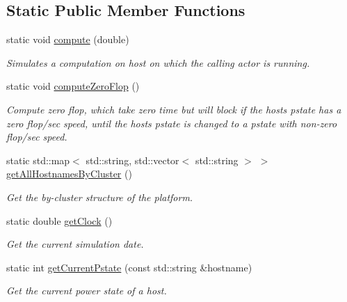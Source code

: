 \subsection*{Static Public Member Functions}
\begin{DoxyCompactItemize}
\item 
static void \hyperlink{classwrench_1_1_s4_u___simulation_a3be8d3823b30b2b7ebb27771a8baa0cd}{compute} (double)
\begin{DoxyCompactList}\small\item\em Simulates a computation on host on which the calling actor is running. \end{DoxyCompactList}\item 
\mbox{\label{classwrench_1_1_s4_u___simulation_a5c4aa7aa025722d5f5b8bae6338066f0}} 
static void \hyperlink{classwrench_1_1_s4_u___simulation_a5c4aa7aa025722d5f5b8bae6338066f0}{compute\+Zero\+Flop} ()
\begin{DoxyCompactList}\small\item\em Compute zero flop, which take zero time but will block if the host\textquotesingle{}s pstate has a zero flop/sec speed, until the host\textquotesingle{}s pstate is changed to a pstate with non-\/zero flop/sec speed. \end{DoxyCompactList}\item 
static std\+::map$<$ std\+::string, std\+::vector$<$ std\+::string $>$ $>$ \hyperlink{classwrench_1_1_s4_u___simulation_a9f45613070010a4d280b1a37af4c5061}{get\+All\+Hostnames\+By\+Cluster} ()
\begin{DoxyCompactList}\small\item\em Get the by-\/cluster structure of the platform. \end{DoxyCompactList}\item 
static double \hyperlink{classwrench_1_1_s4_u___simulation_aa6e86b42e87be87991c1e5bdf1a90a55}{get\+Clock} ()
\begin{DoxyCompactList}\small\item\em Get the current simulation date. \end{DoxyCompactList}\item 
static int \hyperlink{classwrench_1_1_s4_u___simulation_a203b09c00201a4d4501c25df69c2aca5}{get\+Current\+Pstate} (const std\+::string \&hostname)
\begin{DoxyCompactList}\small\item\em Get the current power state of a host. \end{DoxyCompactList}\item 

\end{DoxyCompactItemize}
